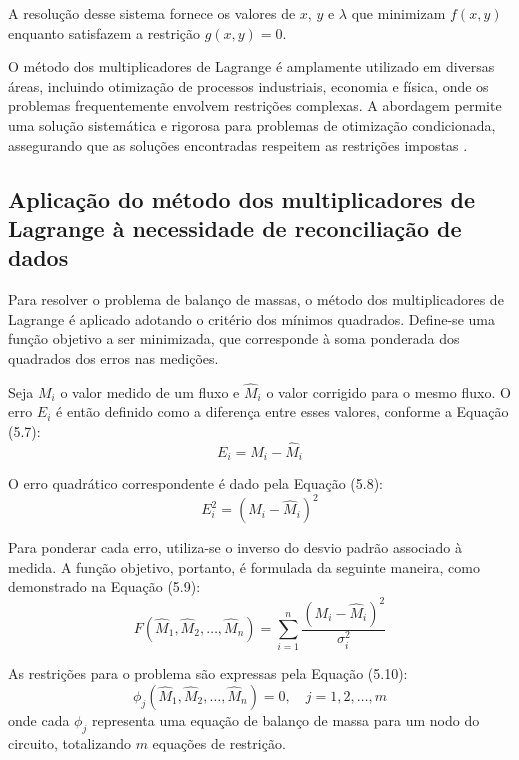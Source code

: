 A resolução desse sistema fornece os valores de $x$, $y$ e $\lambda$ que minimizam $f(x, y)$ enquanto satisfazem a restrição $g(x, y) = 0$.

O método dos multiplicadores de Lagrange é amplamente utilizado em diversas áreas, incluindo otimização de processos industriais, economia e física, onde os problemas frequentemente envolvem restrições complexas. A abordagem permite uma solução sistemática e rigorosa para problemas de otimização condicionada, assegurando que as soluções encontradas respeitem as restrições impostas \cite{lagrangeoptbook}.

\subsection{Aplicação do método dos multiplicadores de Lagrange à necessidade de reconciliação de dados}

Para resolver o problema de balanço de massas, o método dos multiplicadores de Lagrange é aplicado adotando o critério dos mínimos quadrados. Define-se uma função objetivo a ser minimizada, que corresponde à soma ponderada dos quadrados dos erros nas medições.

Seja $M_i$ o valor medido de um fluxo e $\hat{M}_i$ o valor corrigido para o mesmo fluxo. O erro $E_i$ é então definido como a diferença entre esses valores, conforme a Equação (5.7):
\begin{equation}
	E_i = M_i - \hat{M}_i
\end{equation}

O erro quadrático correspondente é dado pela Equação (5.8):
\begin{equation}
	E_i^2 = (M_i - \hat{M}_i)^2
\end{equation}

Para ponderar cada erro, utiliza-se o inverso do desvio padrão associado à medida. A função objetivo, portanto, é formulada da seguinte maneira, como demonstrado na Equação (5.9):
\begin{equation}
	F(\hat{M}_1, \hat{M}_2, \dots, \hat{M}_n) = \sum_{i=1}^n \frac{(M_i - \hat{M}_i)^2}{\sigma_i^2}
\end{equation}

As restrições para o problema são expressas pela Equação (5.10):
\begin{equation}
	\phi_j(\hat{M}_1, \hat{M}_2, \dots, \hat{M}_n) = 0, \quad j = 1, 2, \dots, m
\end{equation}
onde cada $\phi_j$ representa uma equação de balanço de massa para um nodo do circuito, totalizando $m$ equações de restrição.

